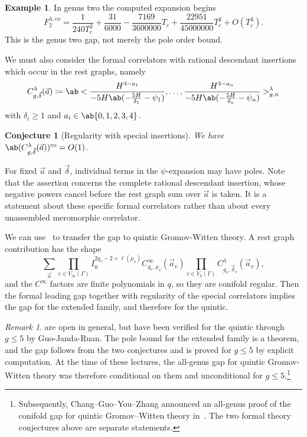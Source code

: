 \documentclass{amsart}
\newtheorem{conj}[thm]{Conjecture}
\theoremstyle{definition}
\newtheorem{exm}[thm]{Example}
\theoremstyle{remark}
\newtheorem{rmk}[thm]{Remark}
\theoremstyle{plain}
\theoremstyle{definition}
\theoremstyle{remark}
\newcommand{\mr}[1]{\mathrm{#1}}
\newcommand{\1}{\mathbf{1}}
\newcommand{\2}{\mathbf{2}}
\newcommand{\3}{\mathbf{3}}
\begin{document}
\begin{exm}
    In genus two the computed expansion begins
    \[ F_2^{\lambda,\mr{co}} = \frac{1}{240T_c^2} + \frac{31}{6000} - \frac{7169}{3600000}T_c + \frac{22951}{45000000}T_c^2 + O(T_c^3). \]
    This is the genus two gap, not merely the pole order bound.
\end{exm}

We must also consider the formal correlators with rational descendant insertions which occur in the rest graphs, namely
\[ C^{\lambda}_{g,\vec{\delta}}(\vec{a}) \coloneqq \ab< \frac{H^{3-a_1}}{-5H\ab(-\frac{5H}{\delta_1}-\psi_1)}, \ldots, \frac{H^{3-a_n}}{-5H\ab(-\frac{5H}{\delta_n}-\psi_n)}>^{\lambda}_{g,n} \]
with \(\delta_i \geq 1\) and \(a_i \in \ab\{0,1,2,3,4\}\).

\begin{conj}[Regularity with special insertions]%
\label{conj:special correlator regularity}
    We have \(\ab(C^{\lambda}_{g,\vec{\delta}}(\vec{a}))^{\mr{co}} = O(1)\).
\end{conj}

For fixed \(\vec{a}\) and \(\vec{\delta}\), individual terms in the \(\psi\)-expansion may have poles. Note that the assertion concerns the complete rational descendant insertion, whose negative powers cancel before the rest graph sum over \(\vec{a}\) is taken. It is a statement about these specific formal correlators rather than about every unassembled meromorphic correlator.

We can use~ to transfer the gap to quintic Gromov-Witten theory. A rest graph contribution has the shape
\[ \sum_{\vec{a}} \prod_{v \in V_{\infty}(\Gamma)}I_0^{2g_v-2+\ell(\mu_v)}C^{\infty}_{g_v,\mu_v}(\vec{a}_v)\prod_{v\in V_0(\Gamma)}C^{\lambda}_{g_v,\vec{\delta}_v}(\vec{a}_v), \]
and the \(C^{\infty}\) factors are finite polynomials in \(q\), so they are conifold regular. Then the formal leading gap together with regularity of the special correlators implies the gap for the extended family, and therefore for the quintic.

\begin{rmk}
     are open in general, but have been verified for the quintic through \(g \leq 5\) by Guo-Janda-Ruan. The pole bound for the extended family is a theorem, and the gap follows from the two conjectures and is proved for \(g \leq 5\) by explicit computation. At the time of these lectures, the all-genus gap for quintic Gromov-Witten theory was therefore conditional on them and unconditional for \(g \leq 5\).\footnote{Subsequently, Chang--Guo--You--Zhang announced an all-genus proof of the conifold gap for quintic Gromov--Witten theory in~\cite{CGYZ2026}. The two formal theory conjectures above are separate statements.}
\end{rmk}
\end{document}
